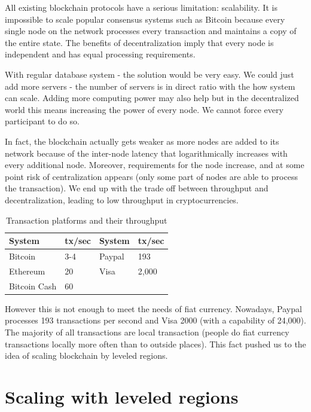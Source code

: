 All existing blockchain protocols have a serious limitation: scalability. It is
impossible to scale popular consensus systems such as Bitcoin because every
single node on the network processes every transaction and maintains a copy of
the entire state. The benefits of decentralization imply that every node is
independent and has equal processing requirements.

With regular database system - the solution would be very easy. We could just
add more servers - the number of servers is in direct ratio with the how system
can scale. Adding more computing power may also help but in the decentralized
world this means increasing the power of every node.  We cannot force every
participant to do so.

In fact, the blockchain actually gets weaker as more nodes are added to its
network because of the inter-node latency that logarithmically increases with
every additional node. Moreover, requirements for the node increase, and at
some point risk of centralization appears (only some part of nodes are able to
process the transaction). We end up with the trade off between throughput and
decentralization, leading to low throughput in cryptocurrencies.

\begin{table}
\centering
\begin{tabular}{l l | l l}
\textbf{System} & \textbf{tx/sec} & \textbf{System} & \textbf{tx/sec} \\
\midrule
Bitcoin & 3-4 &        Paypal &  193 \\
Ethereum & 20 &        Visa & 2,000 \\
Bitcoin Cash & 60 &          &       \\
\end{tabular}
\caption{Transaction platforms and their throughput}
\end{table}

However this is not enough to meet the needs of fiat currency.  Nowadays,
Paypal processes 193 transactions per second and Visa 2000 (with a capability
of 24,000). The majority of all transactions are local transaction (people do
fiat currency transactions locally more often than to outside places). This
fact pushed us to the idea of scaling blockchain by leveled regions.

\section{Scaling with leveled regions}

